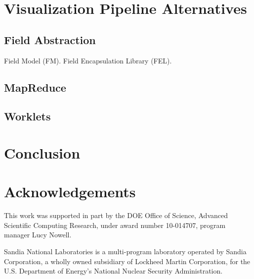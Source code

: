\documentclass[twocolumn,10pt]{article}
\begin{document}
\section{Visualization Pipeline Alternatives}
\label{sec:Alternatives}

\subsection{Field Abstraction}
\label{sec:FieldAbstraction}

Field Model (FM).  Field Encapsulation Library (FEL).

\subsection{MapReduce}
\label{sec:MapReduce}

\subsection{Worklets}
\label{sec:Worklets}


\section{Conclusion}
\label{sec:Conclusion}


\section{Acknowledgements}

This work was supported in part by the DOE Office of Science, Advanced
Scientific Computing Research, under award number 10-014707, program
manager Lucy Nowell.

Sandia National Laboratories is a multi-program laboratory operated by
Sandia Corporation, a wholly owned subsidiary of Lockheed Martin
Corporation, for the U.S. Department of Energy's National Nuclear Security
Administration.



\end{document}
